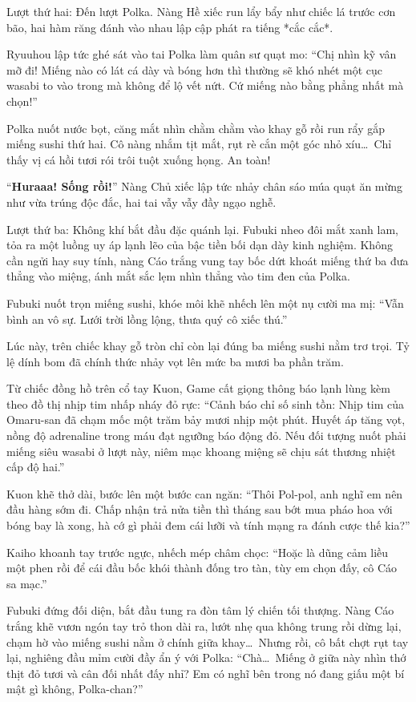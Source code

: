 \documentclass[../main.tex]{subfiles}
\begin{document}
Lượt thứ hai: Đến lượt Polka. Nàng Hề xiếc run lẩy bẩy như chiếc lá trước cơn bão, hai hàm răng đánh vào nhau lập cập phát ra tiếng *cắc cắc*.

Ryuuhou lập tức ghé sát vào tai Polka làm quân sư quạt mo: ``Chị nhìn kỹ vân mỡ đi! Miếng nào có lát cá dày và bóng hơn thì thường sẽ khó nhét một cục wasabi to vào trong mà không để lộ vết nứt. Cứ miếng nào bằng phẳng nhất mà chọn!''

Polka nuốt nước bọt, căng mắt nhìn chằm chằm vào khay gỗ rồi run rẩy gắp miếng sushi thứ hai. Cô nàng nhắm tịt mắt, rụt rè cắn một góc nhỏ xíu\dots\ Chỉ thấy vị cá hồi tươi rói trôi tuột xuống họng. An toàn!

``\textbf{Huraaa! Sống rồi!}'' Nàng Chủ xiếc lập tức nhảy chân sáo múa quạt ăn mừng như vừa trúng độc đắc, hai tai vẫy vẫy đầy ngạo nghễ.

Lượt thứ ba: Không khí bắt đầu đặc quánh lại. Fubuki nheo đôi mắt xanh lam, tỏa ra một luồng uy áp lạnh lẽo của bậc tiền bối dạn dày kinh nghiệm. Không cần ngửi hay suy tính, nàng Cáo trắng vung tay bốc dứt khoát miếng thứ ba đưa thẳng vào miệng, ánh mắt sắc lẹm nhìn thẳng vào tim đen của Polka.

Fubuki nuốt trọn miếng sushi, khóe môi khẽ nhếch lên một nụ cười ma mị: ``Vẫn bình an vô sự. Lưới trời lồng lộng, thưa quý cô xiếc thú.''

Lúc này, trên chiếc khay gỗ tròn chỉ còn lại đúng ba miếng sushi nằm trơ trọi. Tỷ lệ dính bom đã chính thức nhảy vọt lên mức ba mươi ba phần trăm.

Từ chiếc đồng hồ trên cổ tay Kuon, Game cất giọng thông báo lạnh lùng kèm theo đồ thị nhịp tim nhấp nháy đỏ rực: ``Cảnh báo chỉ số sinh tồn: Nhịp tim của Omaru-san đã chạm mốc một trăm bảy mươi nhịp một phút. Huyết áp tăng vọt, nồng độ adrenaline trong máu đạt ngưỡng báo động đỏ. Nếu đối tượng nuốt phải miếng siêu wasabi ở lượt này, niêm mạc khoang miệng sẽ chịu sát thương nhiệt cấp độ hai.''

Kuon khẽ thở dài, bước lên một bước can ngăn: ``Thôi Pol-pol, anh nghĩ em nên đầu hàng sớm đi. Chấp nhận trả nửa tiền thì tháng sau bớt mua pháo hoa với bóng bay là xong, hà cớ gì phải đem cái lưỡi và tính mạng ra đánh cược thế kia?''

Kaiho khoanh tay trước ngực, nhếch mép châm chọc: ``Hoặc là dũng cảm liều một phen rồi để cái đầu bốc khói thành đống tro tàn, tùy em chọn đấy, cô Cáo sa mạc.''

Fubuki đứng đối diện, bắt đầu tung ra đòn tâm lý chiến tối thượng. Nàng Cáo trắng khẽ vươn ngón tay trỏ thon dài ra, lướt nhẹ qua không trung rồi dừng lại, chạm hờ vào miếng sushi nằm ở chính giữa khay\dots\ Nhưng rồi, cô bất chợt rụt tay lại, nghiêng đầu mỉm cười đầy ẩn ý với Polka: ``Chà\dots\ Miếng ở giữa này nhìn thớ thịt đỏ tươi và cân đối nhất đấy nhỉ? Em có nghĩ bên trong nó đang giấu một bí mật gì không, Polka-chan?''
\end{document}
